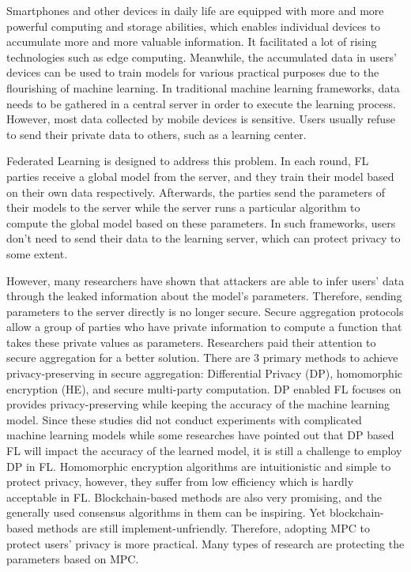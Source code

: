 Smartphones and other devices in daily life are equipped with more and more powerful computing and storage abilities, which enables individual devices to accumulate more and more valuable information. It facilitated a lot of rising technologies such as edge computing. Meanwhile, the accumulated data in users' devices can be used to train models for various practical purposes due to the flourishing of machine learning. In traditional machine learning frameworks, data needs to be gathered in a central server in order to execute the learning process. However, most data collected by mobile devices is sensitive. Users usually refuse to send their private data to others, such as a learning center. 

Federated Learning\cite{mcmahan2016communicationefficient} is designed to address this problem. In each round, FL parties receive a global model from the server, and they train their model based on their own data respectively. Afterwards, the parties send the parameters of their models to the server while the server runs a particular algorithm to compute the global model based on these parameters. In such frameworks, users don't need to send their data to the learning server, which can protect privacy to some extent.

However, many researchers have shown that attackers are able to infer users' data through the leaked information about the model's parameters\cite{Beyond, Leakage}. Therefore, sending parameters to the server directly is no longer secure. Secure aggregation protocols allow a group of parties who have private information to compute a function that takes these private values as parameters. Researchers paid their attention to secure aggregation for a better solution\cite{shi2011privacy,RobustAgg,Bonawitz19,Nike,PrivFL}. There are 3 primary methods to achieve privacy-preserving in secure aggregation: Differential Privacy (DP), homomorphic encryption (HE), and secure multi-party computation. DP enabled FL focuses on provides privacy-preserving while keeping the accuracy of the machine learning model. Since these studies did not conduct experiments with complicated machine learning models while some researches have pointed out that DP based FL will impact the accuracy of the learned model\cite{Two-Phase}, it is still a challenge to employ DP in FL. Homomorphic encryption algorithms are intuitionistic and simple to protect privacy, however, they suffer from low efficiency which is hardly acceptable in FL\cite{HESurvey}. Blockchain-based methods\cite{DeepChain,Lu2020,On-Device} are also very promising, and the generally used consensus algorithms in them can be inspiring. Yet blockchain-based methods are still implement-unfriendly. Therefore, adopting MPC to protect users' privacy is more practical. Many types of research are protecting the parameters based on MPC\cite{Practical,Two-Phase,Weighted,Hybrid}. 

